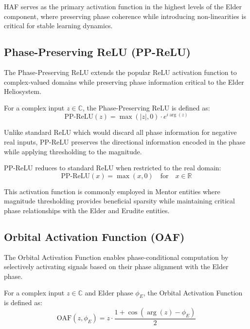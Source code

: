 HAF serves as the primary activation function in the highest levels of the Elder component, where preserving phase coherence while introducing non-linearities is critical for stable learning dynamics.

\subsection{Phase-Preserving ReLU (PP-ReLU)}

The Phase-Preserving ReLU extends the popular ReLU activation function to complex-valued domains while preserving phase information critical to the Elder Heliosystem.

\begin{definition}
For a complex input $z \in \mathbb{C}$, the Phase-Preserving ReLU is defined as:
\begin{equation}
\text{PP-ReLU}(z) = \max(|z|, 0) \cdot e^{i\arg(z)}
\end{equation}
\end{definition}

Unlike standard ReLU which would discard all phase information for negative real inputs, PP-ReLU preserves the directional information encoded in the phase while applying thresholding to the magnitude.

\begin{observation}
PP-ReLU reduces to standard ReLU when restricted to the real domain:
\begin{equation}
\text{PP-ReLU}(x) = \max(x, 0) \quad \text{for} \quad x \in \mathbb{R}
\end{equation}
\end{observation}

This activation function is commonly employed in Mentor entities where magnitude thresholding provides beneficial sparsity while maintaining critical phase relationships with the Elder and Erudite entities.

\subsection{Orbital Activation Function (OAF)}

The Orbital Activation Function enables phase-conditional computation by selectively activating signals based on their phase alignment with the Elder phase.

\begin{definition}
For a complex input $z \in \mathbb{C}$ and Elder phase $\phi_E$, the Orbital Activation Function is defined as:
\begin{equation}
\text{OAF}(z, \phi_E) = z \cdot \frac{1 + \cos(\arg(z) - \phi_E)}{2}
\end{equation}
\end{definition}

